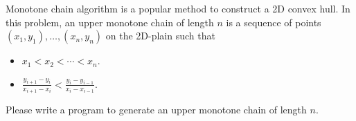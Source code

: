 Monotone chain algorithm is a popular method to construct a 2D convex hull.
In this problem, an upper monotone chain of length $n$ is 
a sequence of points $(x_1,y_1),\ldots,(x_n,y_n)$ on the 2D-plain such that
\begin{itemize}
\item $x_1 < x_2 < \cdots < x_n$.
\item $\frac{y_{i+1}-y_i}{x_{i+1}-x_i} < \frac{y_i-y_{i-1}}{x_i-x_{i-1}}$.
\end{itemize}


Please write a program to generate an upper monotone chain of length $n$.
